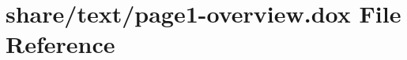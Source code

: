 \hypertarget{page1-overview_8dox}{\section{share/text/page1-\/overview.dox File Reference}
\label{page1-overview_8dox}
}

